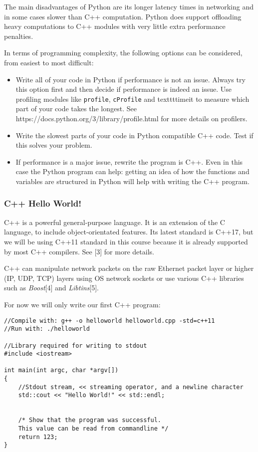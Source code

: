 \documentclass[a4paper]{article}
\begin{document}
The main disadvantages of Python are its longer latency times in networking and in some cases slower than C++ computation. Python does support offloading heavy computations to C++ modules with very little extra performance penalties. 

In terms of programming complexity, the following options can be considered, from easiest to most difficult: 
\begin{itemize}
\item Write all of your code in Python if performance is not an issue. Always try this option first and then decide if performance is indeed an issue. Use profiling modules like \texttt{profile}, \texttt{cProfile} and texttt{timeit} to measure which part of your code takes the longest. See https://docs.python.org/3/library/profile.html for more details on profilers. 
\item Write the slowest parts of your code in Python compatible C++ code. Test if this solves your problem.
\item If performance is a major issue, rewrite the program is C++. Even in this case the Python program can help: getting an idea of how the functions and variables are structured in Python will help with writing the C++ program.
\end{itemize}

\subsubsection{C++ Hello World!}
C++ is a powerful general-purpose language. It is an extension of the C language, to include object-orientated features. Its latest standard is C++17, but we will be using C++11 standard in this course because it is already supported by most C++ compilers. See [3] for more details. 

C++ can manipulate network packets on the raw Ethernet packet layer or higher (IP, UDP, TCP) layers using OS network sockets or use various C++ libraries such as \emph{Boost}[4] and \emph{Libtins}[5].  

For now we will only write our first C++ program:

\begin{lstlisting}
//Compile with: g++ -o helloworld helloworld.cpp -std=c++11
//Run with: ./helloworld

//Library required for writing to stdout
#include <iostream>

int main(int argc, char *argv[])
{
	//Stdout stream, << streaming operator, and a newline character
	std::cout << "Hello World!" << std::endl;

	
	/* Show that the program was successful. 
	This value can be read from commandline */
	return 123;
}
\end{lstlisting}
\end{document}

